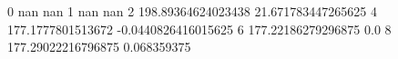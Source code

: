 0 nan nan
1 nan nan
2 198.89364624023438 21.671783447265625
4 177.1777801513672 -0.0440826416015625
6 177.22186279296875 0.0
8 177.29022216796875 0.068359375
